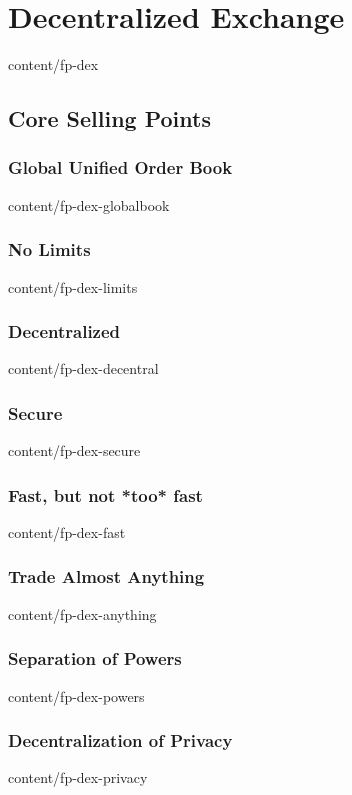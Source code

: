 \documentclass[conference,final,10pt,a4paper]{IEEEtran}
\begin{document}
\section       { Decentralized Exchange                          }  { content/fp-dex                 } 
\subsection    { Core Selling Points                             } 
\subsubsection { Global Unified Order Book                       }  { content/fp-dex-globalbook      } 
\subsubsection { No Limits                                       }  { content/fp-dex-limits          } 
\subsubsection { Decentralized                                   }  { content/fp-dex-decentral       } 
\subsubsection { Secure                                          }  { content/fp-dex-secure          } 
\subsubsection { Fast, but not *too* fast                        }  { content/fp-dex-fast            } 
\subsubsection { Trade Almost Anything                           }  { content/fp-dex-anything        } 
\subsubsection { Separation of Powers                            }  { content/fp-dex-powers          } 
\subsubsection { Decentralization of Privacy                     }  { content/fp-dex-privacy         } 
\end{document}
